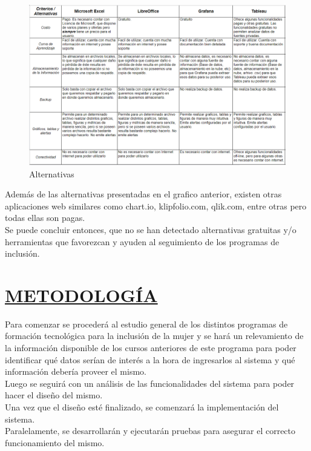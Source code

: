 \begin{figure}[H]
	\centering
	\includegraphics[width=\textwidth]{imagenes/alternativas.png} 
	\caption{Alternativas}
\end{figure}

Además de las alternativas presentadas en el grafico anterior, existen otras aplicaciones web similares como chart.io, klipfolio.com, qlik.com, entre otras pero todas ellas son pagas. \\


Se puede concluir entonces, que no se han detectado alternativas gratuitas y/o herramientas que favorezcan y ayuden al seguimiento de los programas de inclusión.\\


\section*{\underline{METODOLOGÍA}}
Para comenzar se procederá al estudio general de los distintos programas de formación tecnológica para la inclusión de la mujer y se hará un relevamiento de la información disponible de los cursos anteriores de este programa para poder identificar qué datos serían de interés a la hora de ingresarlos al sistema y qué información debería proveer el mismo.\\

Luego se seguirá con un análisis de las funcionalidades del sistema para poder hacer el diseño del mismo.\\

Una vez que el diseño esté finalizado, se comenzará la implementación del sistema.\\

Paralelamente, se desarrollarán y ejecutarán pruebas para asegurar el correcto funcionamiento del mismo.\\

